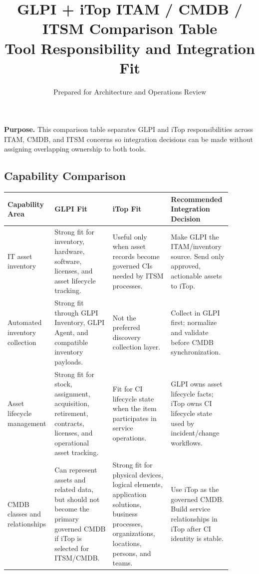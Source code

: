 \documentclass[11pt]{article}
\title{\bfseries\color{Navy} GLPI + iTop ITAM / CMDB / ITSM Comparison Table\\\large Tool Responsibility and Integration Fit}
\author{Prepared for Architecture and Operations Review}
\date{\docversion}
\begin{document}
\maketitle
\thispagestyle{fancy}

\begin{purposebox}
\textbf{Purpose.} This comparison table separates GLPI and iTop responsibilities across ITAM, CMDB, and ITSM concerns so integration decisions can be made without assigning overlapping ownership to both tools.
\end{purposebox}

\begin{landscape}
\section{Capability Comparison}
\small
\begin{longtable}{p{0.16\linewidth}p{0.25\linewidth}p{0.25\linewidth}p{0.23\linewidth}}
\toprule
\rowcolor{LightBlue}\textbf{Capability Area} & \textbf{GLPI Fit} & \textbf{iTop Fit} & \textbf{Recommended Integration Decision} \\
\midrule
IT asset inventory & Strong fit for inventory, hardware, software, licenses, and asset lifecycle tracking. & Useful only when asset records become governed CIs needed by ITSM processes. & Make GLPI the ITAM/inventory source. Send only approved, actionable assets to iTop. \\
\addlinespace
Automated inventory collection & Strong fit through GLPI Inventory, GLPI Agent, and compatible inventory payloads. & Not the preferred discovery collection layer. & Collect in GLPI first; normalize and validate before CMDB synchronization. \\
\addlinespace
Asset lifecycle management & Strong fit for stock, assignment, acquisition, retirement, contracts, licenses, and operational asset tracking. & Fit for CI lifecycle state when the item participates in service operations. & GLPI owns asset lifecycle facts; iTop owns CI lifecycle state used by incident/change workflows. \\
\addlinespace
CMDB classes and relationships & Can represent assets and related data, but should not become the primary governed CMDB if iTop is selected for ITSM/CMDB. & Strong fit for physical devices, logical elements, application solutions, business processes, organizations, locations, persons, and teams. & Use iTop as the governed CMDB. Build service relationships in iTop after CI identity is stable. \\

\end{longtable}
\end{landscape}
\end{document}
